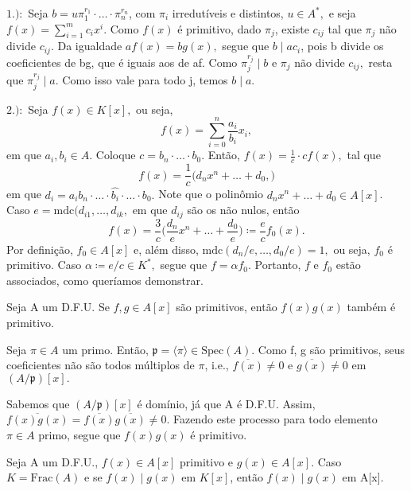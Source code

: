 \documentclass[algebraII_notes.tex]{subfiles}
\begin{document}
\begin{proof*}
	\(1.):\) Seja \(b = u\pi_{1}^{r_{1}}\cdot \dotsc \cdot \pi_{n}^{r_{n}}\), com \(\pi_{i}\) irredutíveis e distintos, \(u\in A^{*},\)
	e seja \(f(x) = \sum\limits_{i=1}^{m}c_{i}x^{i}.\) Como \(f(x)\) é primitivo, dado \(\pi_{j}\), existe \(c_{ij}\) tal que \(\pi_{j}\)
	não divide \(c_{ij}.\) Da igualdade \(af(x) = bg(x),\) segue que \(b\mid ac_{i}\), pois b divide os coeficientes
	de bg, que é iguais aos de af. Como \(\pi_{j}^{r_{j}}\mid b\) e \(\pi_{j}\) não divide \(c_{ij},\) resta que \(\pi_{j}^{r_{j}}\mid a.\)
	Como isso vale para todo j, temos \(b\mid a.\)

	\(2.):\) Seja \(f(x)\in K[x],\) ou seja,
	\[
		f(x) = \sum\limits_{i=0}^{n}\frac{a_{i}}{b_{i}}x_{i},
	\]
	em que \(a_{i}, b_{i}\in A.\) Coloque \(c = b_{n}\cdot \dotsc \cdot b_{0}.\) Então,
	\(f(x) = \frac{1}{c} \cdot cf(x),\) tal que
	\[
		f(x) = \frac{1}{c}\biggl(d_{n}x^{n}+ \dotsc +d_{0},\biggr)
	\]
	em que \(d_{i} = a_{i}b_{n} \cdot \dotsc \cdot \hat{b_{i}}\cdot \dotsc \cdot b_{0}.\) Note que o polinômio
	\(d_{n}x^{n} + \dotsc  + d_{0}\in A[x]\).
	Caso \(e = \mathrm{mdc}(d_{i1}, \dotsc , d_{ik},\) em que \(d_{ij}\) são os não nulos, então
	\[
		f(x) = \frac{3}{c}\biggl(\frac{d_{n}}{e}x^{n} + \dotsc + \frac{d_{0}}{e}\biggr)\coloneqq \frac{e}{c}f_{0}(x).
	\]
	Por definição, \(f_{0}\in A[x]\) e, além disso, \(\mathrm{mdc}(d_{n}/e, \dotsc , d_{0}/e) = 1,\) ou seja, \(f_{0}\) é primitivo.
	Caso \(\alpha\coloneqq e/c \in K^{*},\) segue que \(f = \alpha f_{0}.\) Portanto, \(f\) e \(f_{0}\) estão associados, como queríamos demonstrar. \qedsymbol
\end{proof*}
\begin{lemma*}
	Seja A um D.F.U. Se \(f, g\in A[x]\) são primitivos, então \(f(x)g(x)\) também é primitivo.
\end{lemma*}
\begin{proof*}
	Seja \(\pi \in A\) um primo. Então, \(\mathfrak{p} = \langle \pi  \rangle\in \mathrm{Spec}(A).\) Como f, g
	são primitivos, seus coeficientes não são todos múltiplos de \(\pi \), i.e., \(\overline{f(x)}\neq 0\) e
	\(\overline{g(x)}\neq 0\) em \((A/\mathfrak{p})[x].\)

	Sabemos que \((A/\mathfrak{p})[x]\) é domínio, já que A é D.F.U. Assim, \(\overline{f(x)g(x)} = \overline{f(x)}\overline{g(x)}\neq0.\) Fazendo este processo para
	todo elemento \(\pi \in A\) primo, segue que \(f(x)g(x)\) é primitivo. \qedsymbol
\end{proof*}
\begin{lemma*}
	Seja A um D.F.U., \(f(x)\in A[x]\) primitivo e \(g(x)\in A[x].\) Caso \(K = \mathrm{Frac}(A)\) e se \(f(x)\mid g(x)\) em \(K[x]\), então
	\(f(x)\mid g(x)\) em A[x].
\end{lemma*}
\end{document}
